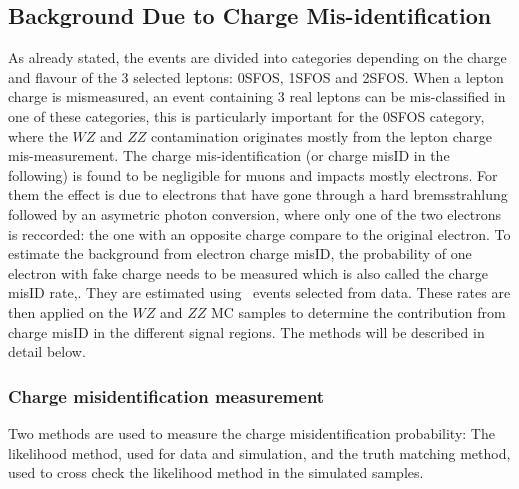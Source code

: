 \subsection{Background Due to Charge Mis-identification}
\label{sec:chargeMisID}

As already stated, the events are divided into categories depending on the charge and flavour of the 3 selected leptons: 0SFOS,
1SFOS and 2SFOS. When a lepton charge is mismeasured, 
an event containing 3 real leptons can be mis-classified in one of these categories, this is particularly important for the 0SFOS category, where the $WZ$ and $ZZ$ contamination originates mostly from the lepton charge mis-measurement.
The charge mis-identification (or charge misID in the following) is found to be negligible for muons and impacts mostly electrons. For them
the effect is due to electrons that have gone through a
hard bremsstrahlung followed by an asymetric photon conversion, where only one of the two electrons is reccorded: the one with an opposite charge compare to the original electron.
To estimate the background from electron charge misID, the probability of one electron with fake charge needs to be measured which is also called the charge misID rate,. They are estimated using \Zee\ events
selected from data. These rates are then applied on the $WZ$ and $ZZ$ MC samples to determine the contribution from charge misID in the different signal regions. The methods will be described in detail below.



\subsubsection{Charge misidentification measurement}

Two methods are used to measure the charge misidentification probability: The likelihood method, used for data and simulation, and the truth matching method, used to cross check the likelihood method in the simulated samples.

